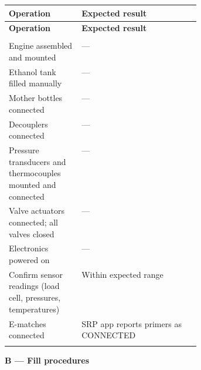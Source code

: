 \medskip
\begin{xltabular}{\linewidth}{@{}>{\raggedright\arraybackslash}p{0.38\linewidth} X@{}}
\toprule
\textbf{Operation} & \textbf{Expected result} \\
\midrule
\endfirsthead
\toprule
\textbf{Operation} & \textbf{Expected result} \\
\midrule
\endhead
\midrule
{} \\
\endfoot
\bottomrule
\endlastfoot
Engine assembled and mounted & --- \\
Ethanol tank filled manually & --- \\
Mother bottles connected & --- \\
Decouplers connected & --- \\
Pressure transducers and thermocouples mounted and connected & --- \\
Valve actuators connected; all valves closed & --- \\
Electronics powered on & --- \\
Confirm sensor readings (load cell, pressures, temperatures) & Within expected range \\
E-matches connected & SRP app reports primers as CONNECTED \\
 \\
\end{xltabular}

\medskip
\noindent\textbf{B --- Fill procedures}

